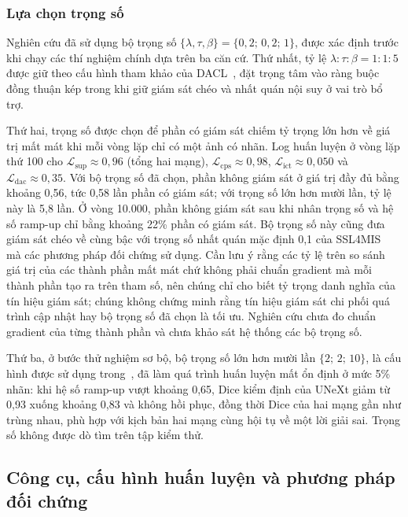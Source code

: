 \documentclass{IEEEtran}
\newcommand{\Lx}[1]{\mathcal{L}_{\mathrm{#1}}}
\begin{document}
\subsubsection{Lựa chọn trọng số}
\label{sec:weights}

Nghiên cứu đã sử dụng bộ trọng số $\{\lambda,\tau,\beta\}=\{0{,}2;\,0{,}2;\,1\}$, được xác định trước khi chạy các thí nghiệm chính dựa trên ba căn cứ. Thứ nhất, tỷ lệ $\lambda:\tau:\beta=1:1:5$ được giữ theo cấu hình tham khảo của DACL~\cite{dacl}, đặt trọng tâm vào ràng buộc đồng thuận kép trong khi giữ giám sát chéo và nhất quán nội suy ở vai trò bổ trợ.

Thứ hai, trọng số được chọn để phần có giám sát chiếm tỷ trọng lớn hơn về giá trị mất mát khi mỗi vòng lặp chỉ có một ảnh có nhãn. Log huấn luyện ở vòng lặp thứ 100 cho $\Lx{sup}\approx0{,}96$ (tổng hai mạng), $\Lx{cps}\approx0{,}98$, $\Lx{ict}\approx0{,}050$ và $\Lx{dac}\approx0{,}35$. Với bộ trọng số đã chọn, phần không giám sát ở giá trị đầy đủ bằng khoảng 0,56, tức 0,58 lần phần có giám sát; với trọng số lớn hơn mười lần, tỷ lệ này là 5,8 lần. Ở vòng 10.000, phần không giám sát sau khi nhân trọng số và hệ số ramp-up chỉ bằng khoảng 22\% phần có giám sát. Bộ trọng số này cũng đưa giám sát chéo về cùng bậc với trọng số nhất quán mặc định 0,1 của SSL4MIS~\cite{ssl4mis} mà các phương pháp đối chứng sử dụng. Cần lưu ý rằng các tỷ lệ trên so sánh giá trị của các thành phần mất mát chứ không phải chuẩn gradient mà mỗi thành phần tạo ra trên tham số, nên chúng chỉ cho biết tỷ trọng danh nghĩa của tín hiệu giám sát; chúng không chứng minh rằng tín hiệu giám sát chi phối quá trình cập nhật hay bộ trọng số đã chọn là tối ưu. Nghiên cứu chưa đo chuẩn gradient của từng thành phần và chưa khảo sát hệ thống các bộ trọng số.

Thứ ba, ở bước thử nghiệm sơ bộ, bộ trọng số lớn hơn mười lần $\{2;\,2;\,10\}$, là cấu hình được sử dụng trong~\cite{dacl}, đã làm quá trình huấn luyện mất ổn định ở mức 5\% nhãn: khi hệ số ramp-up vượt khoảng 0,65, Dice kiểm định của UNeXt giảm từ 0,93 xuống khoảng 0,83 và không hồi phục, đồng thời Dice của hai mạng gần như trùng nhau, phù hợp với kịch bản hai mạng cùng hội tụ về một lời giải sai. Trọng số không được dò tìm trên tập kiểm thử.

\subsection{Công cụ, cấu hình huấn luyện và phương pháp đối chứng}
\label{sec:baselines}
\end{document}
